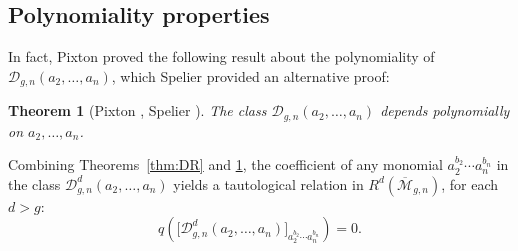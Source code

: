 \documentclass[12pt,reqno]{amsart}
\theoremstyle{plain}
\newtheorem{theorem}{Theorem}
\newtheorem{lemma}[theorem]{Lemma}
\theoremstyle{definition}
\theoremstyle{remark}
\begin{document}

\subsection{Polynomiality properties}
\label{subsec:poly}

In fact, Pixton proved the following result about the polynomiality of $\mathcal{D}_{g,n}(a_2, \ldots, a_n)$, which Spelier provided an alternative proof:
\begin{theorem}[Pixton \cite{Pixton2024}, Spelier \cite{spelier2024polynomiality}]
\label{thm:poly}
The class $\mathcal{D}_{g,n}(a_2, \ldots, a_n)$ depends polynomially on $a_2, \ldots, a_n$.
\end{theorem}
Combining Theorems~\ref{thm:DR} and \ref{thm:poly}, the coefficient of any monomial $a_2^{b_2} \cdots a_n^{b_n}$ in the class $\mathcal{D}_{g,n}^d(a_2, \ldots, a_n)$ yields a tautological relation in $R^d(\overline{\mathcal{M}}_{g,n})$, for each $d > g$:
\begin{equation*}
q\left( \bigg[\mathcal{D}_{g,n}^d(a_2, \ldots, a_n)\bigg]_{a_2^{b_2} \cdots a_n^{b_n}} \right) = 0.
\end{equation*}



\end{document}
